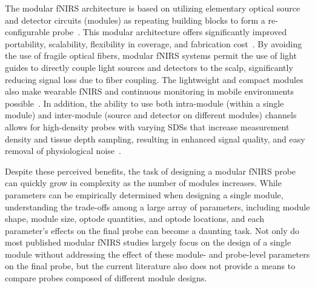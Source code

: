 The modular \ac{fNIRS} architecture is based on utilizing elementary optical source and detector circuits (modules) as repeating building blocks to form a re-configurable probe~\cite{Zhao2017}. This modular architecture offers significantly improved portability, scalability, flexibility in coverage, and fabrication cost~\cite{Zhao2017}. By avoiding the use of fragile optical fibers, modular \ac{fNIRS} systems permit the use of light guides to directly couple light sources and detectors to the scalp, significantly reducing signal loss due to fiber coupling. The lightweight and compact modules also make wearable \ac{fNIRS} and continuous monitoring in mobile environments possible~\cite{Yucel2017, Park2018}. In addition, the ability to use both intra-module (within a single module) and inter-module (source and detector on different modules) channels allows for high-density probes with varying \ac{SDS}s that increase measurement density and tissue depth sampling, resulting in enhanced signal quality, and easy removal of physiological noise~\cite{Gregg2010}. 

Despite these perceived benefits, the task of designing a modular \ac{fNIRS} probe can quickly grow in complexity as the number of modules increases. While parameters can be empirically determined when designing a single module, understanding the trade-offs among a large array of parameters, including module shape, module size, optode quantities, and optode locations, and each parameter's effects on the final probe can become a daunting task. Not only do most published modular \ac{fNIRS} studies largely focus on the design of a single module without addressing the effect of these module- and probe-level parameters on the final probe, but the current literature also does not provide a means to compare probes composed of different module designs.

